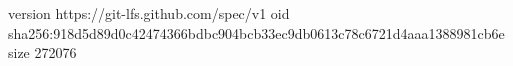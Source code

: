 version https://git-lfs.github.com/spec/v1
oid sha256:918d5d89d0c42474366bdbc904bcb33ec9db0613c78c6721d4aaa1388981cb6e
size 272076
